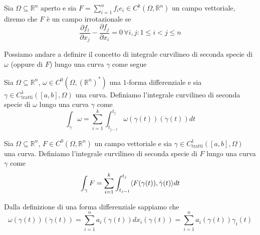 \begin{definition}
	Sia  $\Omega \subseteq \mathbb{R}^n$ aperto e sia $F = \sum_{i=1}^n f_i e_i \in C^k(\Omega, \mathbb{R}^n)$ un campo vettoriale, diremo che $F$ è un campo irrotazionale se
	$$
	\frac{\partial f_i}{\partial x_j} - \frac{\partial f_j}{\partial x_i} = 0 \, \forall i, j: 1 \leq i < j \leq n
	$$
\end{definition}

Possiamo andare a definire il concetto di integrale curvilineo di seconda specie di $\omega$ (oppure di $F$) lungo una curva $\gamma$ come segue
\begin{definition}
	Sia $\Omega \subseteq \mathbb{R}^n$, $\omega \in C^0(\Omega, (\mathbb{R}^n)^*)$ una $1$-forma differenziale e sia $\gamma \in C^1_{\text{tratti}}([a,b], \Omega)$ una curva. Definiamo l'integrale curvilineo di seconda specie di 
	$\omega$ lungo una curva $\gamma$ come
	$$
		\int_\gamma \omega = \sum_{i=1}^k \int_{t_{j-1}}^{t_j} \omega(\gamma(t))(\dot{\gamma}(t))dt
	$$
\end{definition}
\begin{definition}
	Sia $\Omega \subseteq \mathbb{R}^n$, $F \in C^0(\Omega, \mathbb{R}^n)$ un campo vettoriale e sia $\gamma \in C^1_{\text{tratti}}([a, b], \Omega)$ una curva. Definiamo l'integrale curvilineo di seconda specie di 
	$F$ lungo una curva $\gamma$ come 
	$$
		\int_\gamma F = \sum_{i=1}^k \int_{t_{j-1}}^{t_j} \langle F(\gamma(t)), \dot{\gamma}(t) \rangle dt
	$$
\end{definition}
\begin{remark}
Dalla definizione di una forma differenziale sappiamo che
$$
\omega(\gamma(t))(\dot{\gamma}(t)) = \sum_{i=1}^n a_i(\gamma(t))dx_i(\gamma(t)) = \sum_{i=1}^n a_i(\gamma(t))\gamma_i(t) 
$$
\end{remark}

